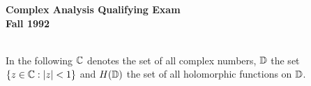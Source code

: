 \documentclass{article}
\begin{document}






\begin{center}\begin{LARGE}
{\bf Complex Analysis Qualifying Exam}\\ 
{\bf Fall 1992}\\ \end{LARGE}
\end{center}
\vspace{0.1in}
\noindent\hrulefill\\
In the following $\Bbb C$ denotes the set of all complex numbers, $\Bbb D$
the set $\{z \in \Bbb C : |z| < 1\}$ and $H(\Bbb D)$ the set of all
holomorphic functions on $\Bbb D$.
\end{document}
